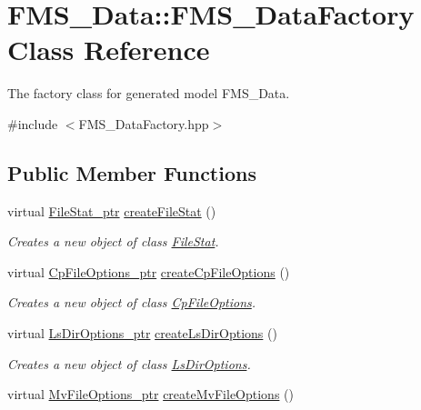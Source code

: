 \hypertarget{classFMS__Data_1_1FMS__DataFactory}{
\section{FMS\_\-Data::FMS\_\-DataFactory Class Reference}
\label{classFMS__Data_1_1FMS__DataFactory}
}


The factory class for generated model FMS\_\-Data.  




{\ttfamily \#include $<$FMS\_\-DataFactory.hpp$>$}

\subsection*{Public Member Functions}
\begin{DoxyCompactItemize}
\item 
virtual \hyperlink{classFMS__Data_1_1FileStat}{FileStat\_\-ptr} \hyperlink{classFMS__Data_1_1FMS__DataFactory_a5c2df85959fd744a7f7383e7dbeb2a36}{createFileStat} ()
\begin{DoxyCompactList}\small\item\em Creates a new object of class \hyperlink{classFMS__Data_1_1FileStat}{FileStat}. \item\end{DoxyCompactList}\item 
virtual \hyperlink{classFMS__Data_1_1CpFileOptions}{CpFileOptions\_\-ptr} \hyperlink{classFMS__Data_1_1FMS__DataFactory_aab51139d8f476f9679fe4c1c483a0760}{createCpFileOptions} ()
\begin{DoxyCompactList}\small\item\em Creates a new object of class \hyperlink{classFMS__Data_1_1CpFileOptions}{CpFileOptions}. \item\end{DoxyCompactList}\item 
virtual \hyperlink{classFMS__Data_1_1LsDirOptions}{LsDirOptions\_\-ptr} \hyperlink{classFMS__Data_1_1FMS__DataFactory_a9de5897c932e47e2541d76d15b450d1c}{createLsDirOptions} ()
\begin{DoxyCompactList}\small\item\em Creates a new object of class \hyperlink{classFMS__Data_1_1LsDirOptions}{LsDirOptions}. \item\end{DoxyCompactList}\item 
virtual \hyperlink{classFMS__Data_1_1MvFileOptions}{MvFileOptions\_\-ptr} \hyperlink{classFMS__Data_1_1FMS__DataFactory_a826485bcef6078d1966d2319b0213113}{createMvFileOptions} ()

\end{DoxyCompactItemize}
